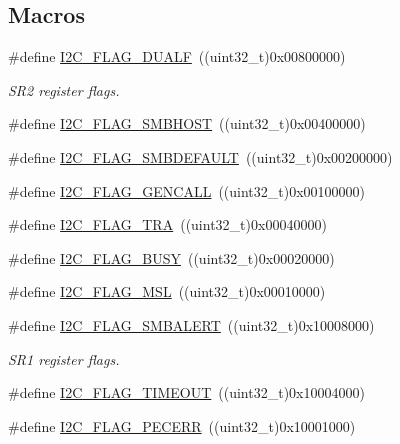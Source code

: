 \subsection*{Macros}
\begin{DoxyCompactItemize}
\item 
\#define \hyperlink{group___i2_c__flags__definition_ga3755b783aa73568659478c2e2e45e27f}{I2\+C\+\_\+\+F\+L\+A\+G\+\_\+\+D\+U\+A\+LF}~((uint32\+\_\+t)0x00800000)
\begin{DoxyCompactList}\small\item\em S\+R2 register flags. \end{DoxyCompactList}\item 
\#define \hyperlink{group___i2_c__flags__definition_gaf15403a1852f39aaadbb8942ba98d97e}{I2\+C\+\_\+\+F\+L\+A\+G\+\_\+\+S\+M\+B\+H\+O\+ST}~((uint32\+\_\+t)0x00400000)
\item 
\#define \hyperlink{group___i2_c__flags__definition_ga371fb29861d1cd41736253e804c67ad5}{I2\+C\+\_\+\+F\+L\+A\+G\+\_\+\+S\+M\+B\+D\+E\+F\+A\+U\+LT}~((uint32\+\_\+t)0x00200000)
\item 
\#define \hyperlink{group___i2_c__flags__definition_gab3a93b6840ad406c2fc09e0e96c59b88}{I2\+C\+\_\+\+F\+L\+A\+G\+\_\+\+G\+E\+N\+C\+A\+LL}~((uint32\+\_\+t)0x00100000)
\item 
\#define \hyperlink{group___i2_c__flags__definition_ga0359a5f960670d51cb17e659d32498ea}{I2\+C\+\_\+\+F\+L\+A\+G\+\_\+\+T\+RA}~((uint32\+\_\+t)0x00040000)
\item 
\#define \hyperlink{group___i2_c__flags__definition_ga50f69f043d99600221076100823b6ff3}{I2\+C\+\_\+\+F\+L\+A\+G\+\_\+\+B\+U\+SY}~((uint32\+\_\+t)0x00020000)
\item 
\#define \hyperlink{group___i2_c__flags__definition_gae8e6a404cbfd70420d278d520304f368}{I2\+C\+\_\+\+F\+L\+A\+G\+\_\+\+M\+SL}~((uint32\+\_\+t)0x00010000)
\item 
\#define \hyperlink{group___i2_c__flags__definition_ga4e1d7cd1574d03ba501c27483300c1be}{I2\+C\+\_\+\+F\+L\+A\+G\+\_\+\+S\+M\+B\+A\+L\+E\+RT}~((uint32\+\_\+t)0x10008000)
\begin{DoxyCompactList}\small\item\em S\+R1 register flags. \end{DoxyCompactList}\item 
\#define \hyperlink{group___i2_c__flags__definition_ga89c8d5d8ccc77a8619fafe9b39d1cc74}{I2\+C\+\_\+\+F\+L\+A\+G\+\_\+\+T\+I\+M\+E\+O\+UT}~((uint32\+\_\+t)0x10004000)
\item 
\#define \hyperlink{group___i2_c__flags__definition_ga6c7addb6413f165f42bcc87506ea8467}{I2\+C\+\_\+\+F\+L\+A\+G\+\_\+\+P\+E\+C\+E\+RR}~((uint32\+\_\+t)0x10001000)

\end{DoxyCompactItemize}

